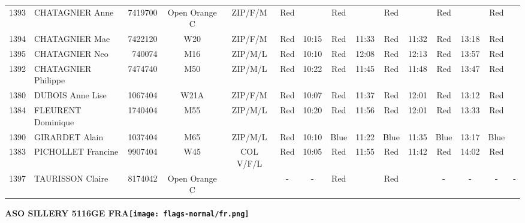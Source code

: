 \documentclass{report}
\begin{document}
\begin{longtable}{|c|l|r|c|c|*{5}{cc|}}
    1393 & CHATAGNIER Anne & 7419700 & Open Orange C & ZIP/F/M & Red &   & Red &   & Red &   & Red &   & Red &  \\
    1394 & CHATAGNIER Mae & 7422120 & W20 & ZIP/F/M & Red & 10:15 & Red & 11:33 & Red & 11:32 & Red & 13:18 & Red &  \\
    1395 & CHATAGNIER Neo & 740074 & M16 & ZIP/M/L & Red & 10:10 & Red & 12:08 & Red & 12:13 & Red & 13:57 & Red &  \\
    1392 & CHATAGNIER Philippe & 7474740 & M50 & ZIP/M/L & Red & 10:22 & Red & 11:45 & Red & 11:48 & Red & 13:47 & Red &  \\
    1380 & DUBOIS Anne Lise & 1067404 & W21A & ZIP/F/M & Red & 10:07 & Red & 11:37 & Red & 12:01 & Red & 13:12 & Red &  \\
    1384 & FLEURENT Dominique & 1740404 & M55 & ZIP/M/L & Red & 10:20 & Red & 11:56 & Red & 12:01 & Red & 13:33 & Red &  \\
    1390 & GIRARDET Alain & 1037404 & M65 & ZIP/M/L & Red & 10:10 & Blue & 11:22 & Blue & 11:35 & Blue & 13:17 & Blue &  \\
    1383 & PICHOLLET Francine & 9907404 & W45 & COL V/F/L & Red & 10:05 & Red & 11:55 & Red & 11:42 & Red & 14:02 & Red &  \\
    1397 & TAURISSON Claire & 8174042 & Open Orange C &   & - &  - & Red &   & Red &   & - &  - & - &  -\\
  \end{longtable}
\newpage
  \Huge \centering \bfseries ASO SILLERY 5116GE FRA\normalfont \footnotesize \sffamily \hfill \texttt{[image: flags-normal/fr.png]} \newline 
\end{document}
